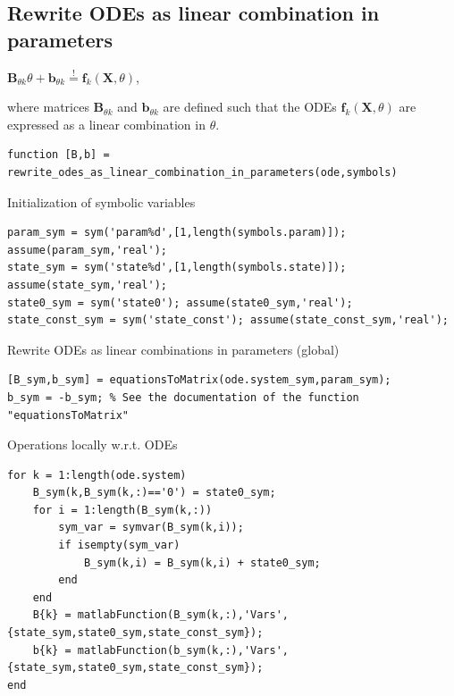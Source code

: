 \color{black}
\begin{par}
\section{ Rewrite ODEs as linear combination in parameters }
\end{par} \vspace{1em}
\begin{par}
$\mathbf{B}_{\theta k} \theta + \mathbf{b}_{\theta k} \stackrel{!}{=} \mathbf{f}_k(\mathbf{X},\theta)$,
\end{par} \vspace{1em}
\begin{par}
where matrices $\mathbf{B}_{\theta k}$ and $\mathbf{b}_{\theta k}$ are defined such that the ODEs $\mathbf{f}_k(\mathbf{X},\theta)$ are expressed as a linear combination in $\theta$.
\end{par} \vspace{1em}
\color{RoyalPurple}\begin{verbatim}
function [B,b] = rewrite_odes_as_linear_combination_in_parameters(ode,symbols)
\end{verbatim}
\color{black}
\begin{par}
Initialization of symbolic variables
\end{par} \vspace{1em}
\color{RoyalPurple}\begin{verbatim}
param_sym = sym('param%d',[1,length(symbols.param)]); assume(param_sym,'real');
state_sym = sym('state%d',[1,length(symbols.state)]); assume(state_sym,'real');
state0_sym = sym('state0'); assume(state0_sym,'real');
state_const_sym = sym('state_const'); assume(state_const_sym,'real');
\end{verbatim}
\color{black}
\begin{par}
Rewrite ODEs as linear combinations in parameters (global)
\end{par} \vspace{1em}
\color{RoyalPurple}\begin{verbatim}
[B_sym,b_sym] = equationsToMatrix(ode.system_sym,param_sym);
b_sym = -b_sym; % See the documentation of the function "equationsToMatrix"
\end{verbatim}
\color{black}
\begin{par}
Operations locally w.r.t. ODEs
\end{par} \vspace{1em}
\color{RoyalPurple}\begin{verbatim}
for k = 1:length(ode.system)
    B_sym(k,B_sym(k,:)=='0') = state0_sym;
    for i = 1:length(B_sym(k,:))
        sym_var = symvar(B_sym(k,i));
        if isempty(sym_var)
            B_sym(k,i) = B_sym(k,i) + state0_sym;
        end
    end
    B{k} = matlabFunction(B_sym(k,:),'Vars',{state_sym,state0_sym,state_const_sym});
    b{k} = matlabFunction(b_sym(k,:),'Vars',{state_sym,state0_sym,state_const_sym});
end
\end{verbatim}
